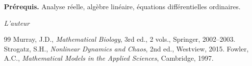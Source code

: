 \documentclass[12pt,a4paper,twoside]{book}
\theoremstyle{definition}
\theoremstyle{plain}
\theoremstyle{remark}
\begin{document}
\medskip

\noindent\textbf{Pr\'erequis.} Analyse r\'eelle, alg\`ebre lin\'eaire, \'equations diff\'erentielles ordinaires.

\vfill
\hfill\textit{L'auteur}


\mainmatter













\backmatter
\begin{thebibliography}{99}
 Murray, J.D., \emph{Mathematical Biology}, 3rd ed., 2 vols., Springer, 2002--2003.
 Strogatz, S.H., \emph{Nonlinear Dynamics and Chaos}, 2nd ed., Westview, 2015.
 Fowler, A.C., \emph{Mathematical Models in the Applied Sciences}, Cambridge, 1997.
\end{thebibliography}
\printindex
\end{document}
